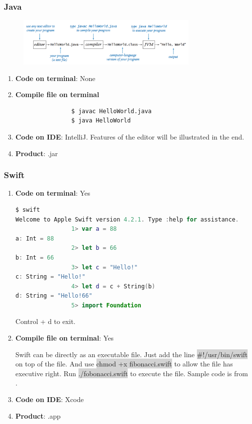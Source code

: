 \documentclass[12pt, a4paper]{report}
\begin{document}
		\subsubsection{Java}
		    \begin{figure}[H]
		        \centering
		        \includegraphics[width=0.8\textwidth]{imgs/developing.png}
		        \caption{\citep{javaCheetsheet}}
		        \label{fig:compiling}
		    \end{figure}
		    \begin{enumerate}
		        \item \textbf{Code on terminal}: \quad None \par 
		        \item \textbf{Compile file on terminal} 
		        \begin{lstlisting}
				$ javac HelloWorld.java
				$ java HelloWorld
			    \end{lstlisting}
			    \item \textbf{Code on IDE}: \quad IntelliJ. Features of the editor will be illustrated in the end.\par 
			    \item \textbf{Product}: \quad .jar 
		    \end{enumerate}
			
		\subsubsection{Swift}
		    \begin{enumerate}
		        \item \textbf{Code on terminal}: \quad Yes \par 
		        \begin{lstlisting}[language=swift]
				$ swift
Welcome to Apple Swift version 4.2.1. Type :help for assistance.
				1> var a = 88
a: Int = 88
				2> let b = 66
b: Int = 66
				3> let c = "Hello!"
c: String = "Hello!"
				4> let d = c + String(b)
d: String = "Hello!66"
				5> import Foundation
		    	\end{lstlisting}
		    	Control + d to exit. 
		    	\item \textbf{Compile file on terminal}: \quad Yes \par 
		    	Swift can be directly as an executable file. Just add the line \colorbox{lightgray}{#!/usr/bin/swift} on top of the file. And use \colorbox{lightgray}{chmod +x fibonacci.swift} to allow the file has executive right. Run \colorbox{lightgray}{./fobonacci.swift} to execute the file. Sample code is from \citep{swiftCompile}.
		    	\item \textbf{Code on IDE}: \quad Xcode \par 
		    	\item \textbf{Product}: \quad .app \par 
		    \end{enumerate}
			 
\end{document}
